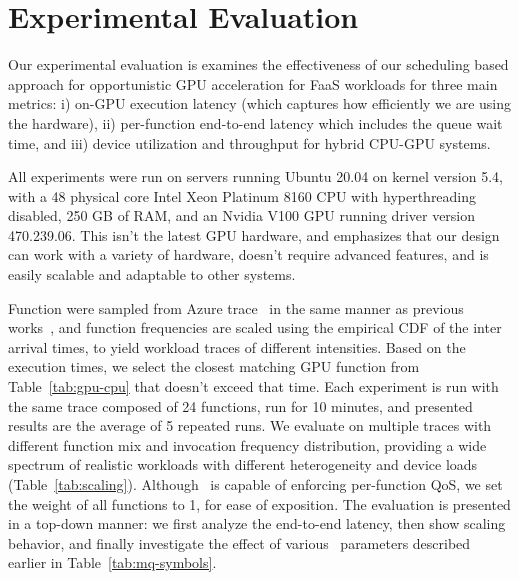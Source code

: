 \section{Experimental Evaluation}
\label{sec:eval}


Our experimental evaluation is examines the effectiveness of our scheduling based approach for opportunistic GPU acceleration for FaaS workloads for three main metrics: i) on-GPU execution latency (which captures how efficiently we are using the hardware), ii) per-function end-to-end latency which includes the queue wait time, and iii) device utilization and throughput for hybrid CPU-GPU systems.



All experiments were run on servers running Ubuntu 20.04 on kernel version 5.4, with a 48 physical core Intel Xeon Platinum 8160 CPU with hyperthreading disabled, 250 GB of RAM, and an Nvidia V100 GPU running driver version 470.239.06. 
This isn't the latest GPU hardware, and emphasizes that our design can work with a variety of hardware, doesn't require advanced features, and is easily scalable and adaptable to other systems.


Function were sampled from Azure trace~\cite{shahrad2020serverless} in the same manner as previous works~\cite{fuerst2023iluvatar,faaslb-hpdc22}, and function frequencies are scaled using the empirical CDF of the inter arrival times, to yield workload traces of different intensities.
Based on the execution times, we select the closest matching GPU function from Table~\ref{tab:gpu-cpu} that doesn't exceed that time. 
Each experiment is run with the same trace composed of 24 functions, run for 10 minutes, and presented results are the average of 5 repeated runs.
We evaluate on multiple traces with different function mix and invocation frequency distribution, providing a wide spectrum of realistic workloads with different heterogeneity and device loads (Table~\ref{tab:scaling}).
Although \QName~is capable of enforcing per-function QoS, we set the weight of all functions to 1, for ease of exposition. 
The evaluation is presented in a top-down manner: we first analyze the end-to-end latency, then show scaling behavior, and finally investigate the effect of various \QName~parameters described earlier in Table~\ref{tab:mq-symbols}. 


